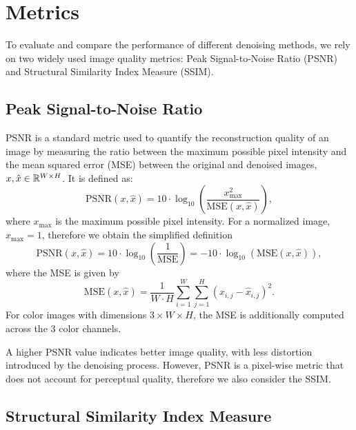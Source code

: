 \newpage

\section{Metrics}

To evaluate and compare the performance of different denoising methods, we rely on two widely used image quality metrics: Peak Signal-to-Noise Ratio (PSNR) and Structural Similarity Index Measure (SSIM).

\subsection{Peak Signal-to-Noise Ratio}

PSNR is a standard metric used to quantify the reconstruction quality of an image by measuring the ratio between the maximum possible pixel intensity and the mean squared error (MSE) between the original and denoised images, $x, \hat{x} \in \mathbb{R}^{W \times H}$.
It is defined as:
\begin{equation}
    \text{PSNR}(x,\hat{x}) = 10 \cdot \log_{10} \left(\frac{x_{\text{max}}^2}{\text{MSE}(x,\hat{x})}\right),
\end{equation}
where $x_{\text{max}}$ is the maximum possible pixel intensity.
For a normalized image, $x_{\text{max}} = 1$, therefore we obtain the simplified definition
\begin{equation}\label{eq:PSNR}
    \text{PSNR}(x,\hat{x}) = 10 \cdot \log_{10} \left(\frac{1}{\text{MSE}}\right) = -10 \cdot \log_{10}(\text{MSE}(x,\hat{x})),
\end{equation}
where the MSE is given by
\begin{equation}\label{eq:MSE}
    \text{MSE}(x,\hat{x}) = \frac{1}{W \cdot H} \sum_{i=1}^{W} \sum_{j=1}^{H} (x_{i,j} - \hat{x}_{i,j})^2.
\end{equation}
For color images with dimensions $3 \times W \times H$, the MSE is additionally computed across the 3 color channels.

A higher PSNR value indicates better image quality, with less distortion introduced by the denoising process.
However, PSNR is a pixel-wise metric that does not account for perceptual quality, therefore we also consider the SSIM\@.

\subsection{Structural Similarity Index Measure}

